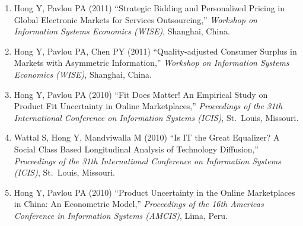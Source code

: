 \documentclass[paper=letter,fontsize=10pt]{scrartcl} %
\newcommand{\ConfEntry}[6]{
		\noindent #1 (#2) ``#3,'' \textit{#4}, #5. \textcolor{blue}{#6}}
\newcommand{\Hong}{Hong Y}
\begin{document}
\begin{enumerate}
\item \ConfEntry{\Hong, Pavlou PA}{2011}{Strategic Bidding and Personalized Pricing in Global Electronic Markets for Services Outsourcing}{Workshop on Information Systems Economics (WISE)}{Shanghai, China}{}

\item \ConfEntry{\Hong, Pavlou PA, Chen PY}{2011}{Quality-adjusted Consumer Surplus in Markets with Asymmetric Information}{Workshop on Information Systems Economics (WISE)}{Shanghai, China}{}

\item \ConfEntry{\Hong, Pavlou PA}{2010}{Fit Does Matter! An Empirical Study on Product Fit Uncertainty in Online Marketplaces}{Proceedings of the 31th International Conference on Information Systems (ICIS)}{St.~Louis, Missouri}{}

\item \ConfEntry{Wattal S, \Hong, Mandviwalla M}{2010}{Is IT the Great Equalizer? A Social Class Based Longitudinal Analysis of Technology Diffusion}{Proceedings of the 31th International Conference on Information Systems (ICIS)}{St.~Louis, Missouri}{}

\item \ConfEntry{\Hong, Pavlou PA}{2010}{Product Uncertainty in the Online Marketplaces in China: An Econometric Model}{Proceedings of the 16th Americas Conference in Information Systems (AMCIS)}{Lima, Peru}{}

\end{enumerate}


\end{document}
